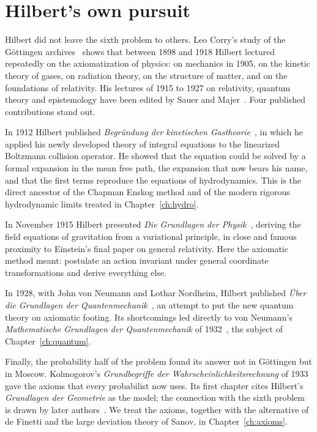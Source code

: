 \section{Hilbert's own pursuit}

Hilbert did not leave the sixth problem to others. Leo Corry's study of the G\"ottingen archives~\cite{corry2004} shows that between 1898 and 1918 Hilbert lectured repeatedly on the axiomatization of physics: on mechanics in 1905, on the kinetic theory of gases, on radiation theory, on the structure of matter, and on the foundations of relativity. His lectures of 1915 to 1927 on relativity, quantum theory and epistemology have been edited by Sauer and Majer~\cite{sauermajer2009}. Four published contributions stand out.

In 1912 Hilbert published \emph{Begr\"undung der kinetischen Gastheorie}~\cite{hilbert1912}, in which he applied his newly developed theory of integral equations to the linearized Boltzmann collision operator. He showed that the equation could be solved by a formal expansion in the mean free path, the expansion that now bears his name, and that the first terms reproduce the equations of hydrodynamics. This is the direct ancestor of the Chapman Enskog method and of the modern rigorous hydrodynamic limits treated in Chapter~\ref{ch:hydro}.

In November 1915 Hilbert presented \emph{Die Grundlagen der Physik}~\cite{hilbert1915}, deriving the field equations of gravitation from a variational principle, in close and famous proximity to Einstein's final paper on general relativity. Here the axiomatic method meant: postulate an action invariant under general coordinate transformations and derive everything else.

In 1928, with John von Neumann and Lothar Nordheim, Hilbert published \emph{\"Uber die Grundlagen der Quantenmechanik}~\cite{hilbertvnn1928}, an attempt to put the new quantum theory on axiomatic footing. Its shortcomings led directly to von Neumann's \emph{Mathematische Grundlagen der Quantenmechanik} of 1932~\cite{vonneumann1932}, the subject of Chapter~\ref{ch:quantum}.

Finally, the probability half of the problem found its answer not in G\"ottingen but in Moscow. Kolmogorov's \emph{Grundbegriffe der Wahrscheinlichkeitsrechnung} of 1933~\cite{kolmogorov1933} gave the axioms that every probabilist now uses. Its first chapter cites Hilbert's \emph{Grundlagen der Geometrie} as the model; the connection with the sixth problem is drawn by later authors~\cite[Section~4]{shafervovk2006}. We treat the axioms, together with the alternative of de Finetti and the large deviation theory of Sanov, in Chapter~\ref{ch:axioms}.

